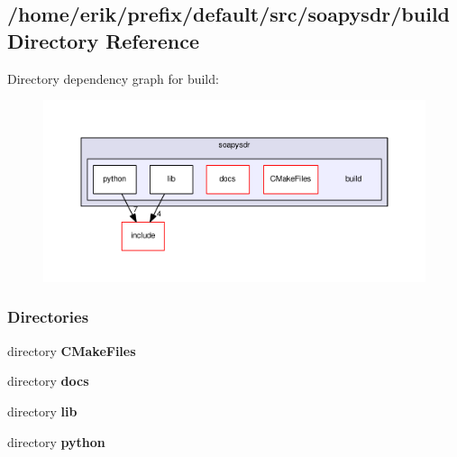 \subsection{/home/erik/prefix/default/src/soapysdr/build Directory Reference}
\label{dir_4671d6e633836b876d3656f3fb896560}
Directory dependency graph for build\+:
\nopagebreak
\begin{figure}[H]
\begin{center}
\leavevmode
\includegraphics[width=350pt]{dir_4671d6e633836b876d3656f3fb896560_dep}
\end{center}
\end{figure}
\subsubsection*{Directories}
\begin{DoxyCompactItemize}
\item 
directory {\bf C\+Make\+Files}
\item 
directory {\bf docs}
\item 
directory {\bf lib}
\item 
directory {\bf python}
\end{DoxyCompactItemize}
